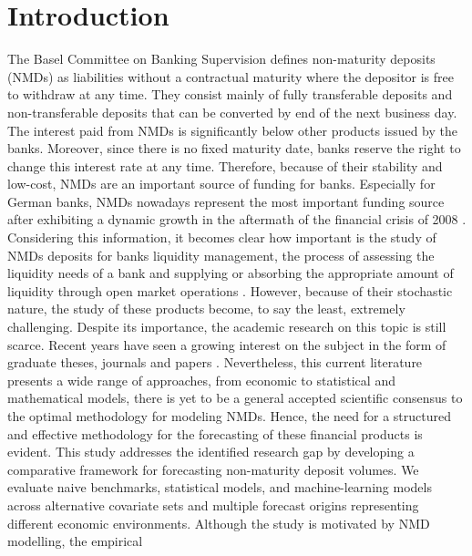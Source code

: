 \documentclass[11pt,a4paper]{article}
\begin{document}
\section{Introduction}
\label{sec:introduction}
The Basel Committee on Banking Supervision \citep{bcbs2016irrbb} defines non-maturity deposits (NMDs) as liabilities without a contractual maturity where the depositor is free to withdraw at any time. They consist mainly of fully transferable deposits and non-transferable deposits that can be converted
by end of the next business day. The interest paid from NMDs is significantly below other products issued by the banks. Moreover, since there is no fixed maturity date, banks reserve the right to change this interest rate at any time. Therefore, because of their stability and low-cost, NMDs are an important source of funding for banks. Especially for German banks, NMDs nowadays represent the most important funding source after exhibiting a dynamic growth in the aftermath of the financial crisis of 2008 \citep{schlueter2015bank}. Considering this information, it becomes clear how important is the study of NMDs deposits for banks liquidity management, the process of assessing the liquidity needs of a bank and supplying or absorbing the appropriate amount of liquidity through open market operations \citep{ecb2011monetary}. However, because of their stochastic nature, the study of these products become, to say the least, extremely challenging. Despite its importance, the academic research on this topic is still scarce. Recent years have seen a growing interest on the subject in the form of graduate theses, journals and papers \citep{winkler2025, marena2022nonmaturing}. Nevertheless, this current literature presents a wide range of approaches, from economic to statistical and mathematical models, there is yet to be a general accepted scientific consensus to the optimal methodology for modeling NMDs. Hence, the need for a structured and effective methodology for the forecasting of these financial products is evident. 
\break
\indent This study addresses the identified research gap by developing a comparative
framework for forecasting non-maturity deposit volumes. We evaluate naive
benchmarks, statistical models, and machine-learning models across alternative
covariate sets and multiple forecast origins representing different economic
environments. Although the study is motivated by NMD modelling, the empirical
\end{document}

